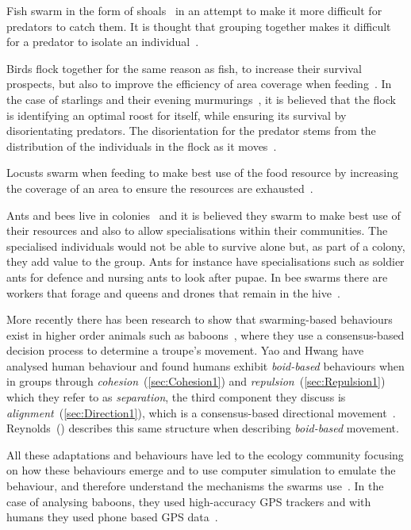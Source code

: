 Fish swarm in the form of shoals~\cite{PMRT:14} in an attempt to make it more difficult for predators to catch them. It is thought that grouping together makes it difficult for a predator to isolate an individual~\cite{MP:87}.

Birds flock together for the same reason as fish, to increase their survival prospects, but also to improve the efficiency of area coverage when feeding~\cite{PMRT:14}. In the case of starlings and their evening murmurings~\cite{YSCGL:12}, it is believed that the flock is identifying an optimal roost for itself, while ensuring its survival by disorientating predators. The disorientation for the predator stems from the distribution of the individuals in the flock as it moves~\cite{CCGP:10}.

Locusts swarm when feeding to make best use of the food resource by increasing the coverage of an area to ensure the resources are exhausted~\cite{GSSC:12, TDEB:12}.

Ants and bees live in colonies~\cite{MK:15, SVP:06} and it is believed they swarm to make best use of their resources and also to allow specialisations within their communities. The specialised individuals would not be able to survive alone but, as part of a colony, they add value to the group. Ants for instance have specialisations such as soldier ants for defence and nursing ants to look after pupae. In bee swarms there are workers that forage and queens and drones that remain in the hive~\cite{BBKA:ND}.

More recently there has been research to show that swarming-based behaviours exist in higher order animals such as baboons~\cite{SFDCIC:15}, where they use a consensus-based decision process to determine a troupe's movement. Yao and Hwang have analysed human behaviour and found humans exhibit \emph{boid-based} behaviours when in groups through \emph{cohesion}~(\autoref{sec:Cohesion1}) and \emph{repulsion}~(\autoref{sec:Repulsion1}) which they refer to as \emph{separation}, the third component they discuss is \emph{alignment}~(\autoref{sec:Direction1}), which is a consensus-based directional movement~\cite{YH:14}. Reynolds~(\cite{REY:87}) describes this same structure when describing \emph{boid-based} movement.

All these adaptations and behaviours have led to the ecology community focusing on how these behaviours emerge and to use computer simulation to emulate the behaviour, and therefore understand the mechanisms the swarms use~\cite{ENNT:10}. In the case of analysing baboons, they used high-accuracy GPS trackers and with humans they used phone based GPS data~\cite{SFDCIC:15}.

